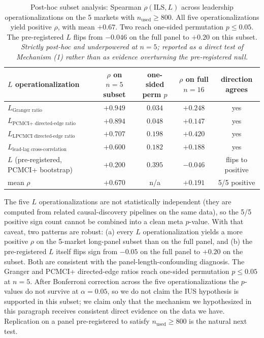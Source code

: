 \documentclass{article}
\begin{document}
\begin{table}[h]
\centering
\caption{Post-hoc subset analysis: Spearman $\rho(\mathrm{ILS}, L)$ across leadership operationalizations on the 5 markets with $n_\text{used} \ge 800$. All five operationalizations yield positive $\rho$, with mean $+0.67$. Two reach one-sided permutation $p \le 0.05$. The pre-registered $L$ flips from $-0.046$ on the full panel to $+0.20$ on this subset. \emph{Strictly post-hoc and underpowered at $n = 5$; reported as a direct test of Mechanism (1) rather than as evidence overturning the pre-registered null.}}
\label{tab:long_panel_subset}
\footnotesize
\begin{tabular}{lcccc}
\toprule
$L$ operationalization & $\rho$ on $n=5$ subset & one-sided perm $p$ & $\rho$ on full $n=16$ & direction agrees \\
\midrule
$L_\text{Granger ratio}$         & $+0.949$ & $\mathbf{0.034}$ & $+0.248$ & yes \\
$L_\text{PCMCI+ directed-edge ratio}$  & $+0.894$ & $\mathbf{0.048}$ & $+0.147$ & yes \\
$L_\text{LPCMCI directed-edge ratio}$  & $+0.707$ & $0.198$         & $+0.420$ & yes \\
$L_\text{lead-lag cross-correlation}$  & $+0.600$ & $0.182$         & $+0.188$ & yes \\
$L$ (pre-registered, PCMCI+ bootstrap) & $+0.200$ & $0.395$         & $-0.046$ & flips to positive \\
\midrule
mean $\rho$                       & $+0.670$ & n/a & $+0.191$ & 5/5 positive \\
\bottomrule
\end{tabular}
\end{table}

The five $L$ operationalizations are not statistically independent (they are computed from related causal-discovery pipelines on the same data), so the 5/5 positive sign count cannot be combined into a clean meta $p$-value. With that caveat, two patterns are robust: (a) every $L$ operationalization yields a more positive $\rho$ on the 5-market long-panel subset than on the full panel, and (b) the pre-registered $L$ itself flips sign from $-0.05$ on the full panel to $+0.20$ on the subset. Both are consistent with the panel-length-confounding diagnosis. The Granger and PCMCI+ directed-edge ratios reach one-sided permutation $p \le 0.05$ at $n = 5$. After Bonferroni correction across the five operationalizations the $p$-values do not survive at $\alpha = 0.05$, so we do not claim the IUS hypothesis is supported in this subset; we claim only that the mechanism we hypothesized in this paragraph receives consistent direct evidence on the data we have. Replication on a panel pre-registered to satisfy $n_\text{used} \ge 800$ is the natural next test.
\end{document}
